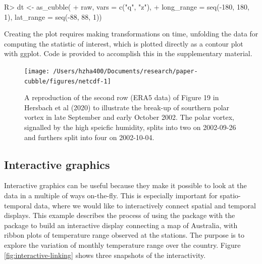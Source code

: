 \documentclass[
  shortnames]{jss}
\begin{document}
\begin{CodeChunk}
\begin{CodeInput}
R> dt <- as_cubble(
+   raw, vars = c("q", "z"),
+   long_range = seq(-180, 180, 1), lat_range = seq(-88, 88, 1))
\end{CodeInput}
\end{CodeChunk}

Creating the plot requires making transformations on time, unfolding the data for computing the statistic of interest, which is plotted directly as a contour plot with ggplot. Code is provided to accomplish this in the supplementary material.

\begin{CodeChunk}
\begin{figure}

{\centering \texttt{[image: /Users/hzha400/Documents/research/paper-cubble/figures/netcdf-1]} 

}

\caption[A reproduction of the second row (ERA5 data) of Figure 19 in Hersbach et al (2020) to illustrate the break-up of sourthern polar vortex in late September and early October 2002]{A reproduction of the second row (ERA5 data) of Figure 19 in Hersbach et al (2020) to illustrate the break-up of sourthern polar vortex in late September and early October 2002. The polar vortex, signalled by the high speicfic humidity, splits into two on 2002-09-26 and furthers split into four on 2002-10-04.}\label{fig:netcdf}
\end{figure}
\end{CodeChunk}

\hypertarget{interactive-graphics-1}{%
\subsection{Interactive graphics}\label{interactive-graphics-1}}

Interactive graphics can be useful because they make it possible to look at the data in a multiple of ways on-the-fly. This is especially important for spatio-temporal data, where we would like to interactively connect spatial and temporal displays. This example describes the process of using the  package with the  package to build an interactive display connecting a map of Australia, with ribbon plots of temperature range observed at the stations. The purpose is to explore the variation of monthly temperature range over the country. Figure \ref{fig:interactive-linking} shows three snapshots of the interactivity.
\end{document}
